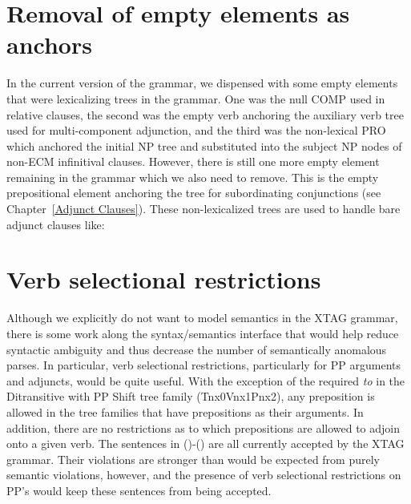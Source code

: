 


\section{Removal of empty elements as anchors}

In the current version of the grammar, we dispensed with some empty
elements that were lexicalizing trees in the grammar. One was the null COMP
used in relative clauses, the second was the empty verb anchoring the
auxiliary verb tree used for multi-component adjunction, and the third was
the non-lexical PRO which anchored the initial NP tree and substituted into
the subject NP nodes of non-ECM infinitival clauses. However, there is
still one more empty element remaining in the grammar which we also need to
remove. This is the empty prepositional element anchoring the tree for
subordinating conjunctions (see Chapter~\ref{Adjunct Clauses}). These
non-lexicalized trees are used to handle bare adjunct clauses like:


\section{Verb selectional restrictions}

Although we explicitly do not want to model semantics in the XTAG grammar,
there is some work along the syntax/semantics interface that would help reduce
syntactic ambiguity and thus decrease the number of semantically anomalous
parses.  In particular, verb selectional restrictions, particularly for PP
arguments and adjuncts, would be quite useful.  With the exception of the
required {\it to} in the Ditransitive with PP Shift tree family (Tnx0Vnx1Pnx2),
any preposition is allowed in the tree families that have prepositions as their
arguments.  In addition, there are no restrictions as to which prepositions are
allowed to adjoin onto a given verb.  The sentences in ()-() are
all currently accepted by the XTAG grammar.  Their violations are stronger than
would be expected from purely semantic violations, however, and the presence of
verb selectional restrictions on PP's would keep these sentences from being
accepted.


